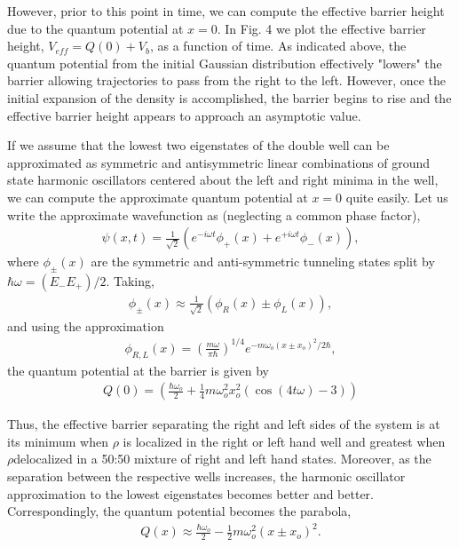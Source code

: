 However, prior to this point in time, we can compute the effective 
barrier height due to the quantum potential at $x=0$.  In Fig.  4 we plot 
the effective barrier height, $V_{eff}=Q(0)+{V_b}$, as a function of 
time.  As indicated above, the quantum potential from the initial Gaussian 
distribution effectively "lowers" the barrier allowing trajectories to 
pass from the right to the left.  However, once the initial expansion 
of the density is accomplished, the barrier begins to rise and the 
effective barrier height appears to approach an asymptotic value.

If we assume that the lowest two eigenstates of the double well can be 
approximated as symmetric and antisymmetric linear combinations of 
ground state harmonic oscillators centered about the left and right 
minima in the well, we can compute the approximate quantum potential at 
$x=0$ quite easily.  Let us write the approximate wavefunction as 
(neglecting a common phase factor),
\begin{eqnarray}
\psi(x,t)   =  
\frac{1}{\sqrt{2}}
(e^{-i \omega t}\phi_{+}(x)  +
   e^{+i\omega t}\phi_{-}(x)),
    \label{eq:34}
\end{eqnarray}
where $\phi_\pm(x)$ are the symmetric and anti-symmetric tunneling states 
split by $\hbar\omega =(E_-E_+)/2$.  Taking,
\begin{eqnarray}
\phi_\pm(x) \approx\frac{1}{\sqrt{2}}
(\phi_R(x) \pm \phi_L(x)),
    \label{eq:35}
\end{eqnarray}
and using the approximation
\begin{eqnarray}
\phi_{R,L}(x)  = 
\left(
\frac{m \omega}{\pi \hbar }
\right)^{1/4}
e^{-m \omega_o(x\pm{x_o})^2/2\hbar },   
    \label{eq:36}
\end{eqnarray}
the quantum potential at the barrier is given by
\begin{eqnarray}
Q(0)  =
\left(\frac{\hbar \omega_o}{2} +   \frac{1}{4}m  \omega_o^{2}
x_o^2( \cos(4  t   \omega )-3)\right)
    \label{eq:37}
\end{eqnarray}

Thus, the effective barrier separating the right and left sides of the 
system is at its minimum when $\rho $ is localized in the right or 
left hand well and greatest when $\rho $delocalized in a 50:50 mixture 
of right and left hand states.  Moreover, as the separation between 
the respective wells increases, the harmonic oscillator approximation 
to the lowest eigenstates becomes better and better.  Correspondingly, 
the quantum potential becomes the parabola,
\begin{eqnarray}
Q(x) \approx    \frac{\hbar \omega_o}{2}
-  \frac{1}{2}m  
\omega_o^2(x\pm x_o)^2.
    \label{eq:38}
\end{eqnarray}

